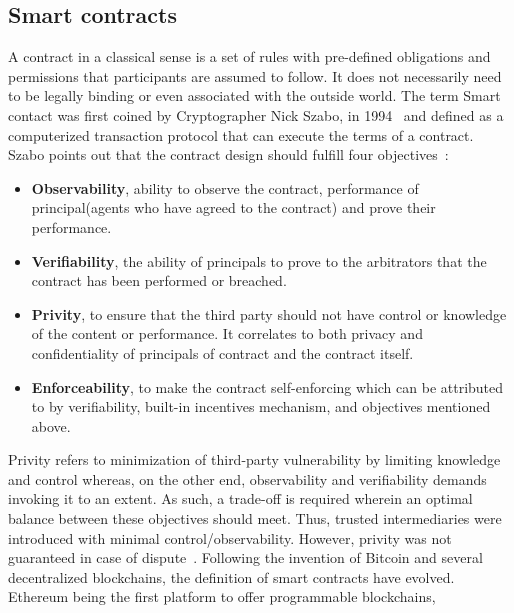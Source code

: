 \subsection{Smart contracts}
A contract in a classical sense is a set of rules with pre-defined obligations
and permissions that participants are assumed to follow. It does not
necessarily need to be legally binding or even associated with the outside
world. The term Smart contact was first coined by Cryptographer Nick Szabo, in
1994~\cite{SzaboSmart1994} and defined as a computerized transaction protocol
that can execute the terms of a contract. Szabo points out that the contract
design should fulfill four objectives~\cite{szabo1996smart}: \\
\begin{itemize}
	\item \textbf{Observability}, ability to observe the contract, performance of
		principal(agents who have agreed to the contract) and prove their
		performance.\\
	\item \textbf{Verifiability}, the ability of principals to prove to the
		arbitrators that the contract has been performed or breached. \\ 
	\item \textbf{Privity}, to ensure that the third party should not have
		control or knowledge of the content or performance. It correlates to
		both privacy and confidentiality of principals of contract and the
		contract itself. \\
	\item \textbf{Enforceability}, to make the contract self-enforcing which
		can be attributed to by verifiability, built-in incentives mechanism,
		and objectives mentioned above. \\
\end{itemize}
Privity refers to minimization of third-party vulnerability by limiting
knowledge and control whereas, on the other end, observability and
verifiability demands invoking it to an extent. As such, a trade-off is
required wherein an optimal balance between these objectives should meet. Thus,
trusted intermediaries were introduced with minimal control/observability.
However, privity was not guaranteed in case of
dispute~\cite{szabo1997formalizing}. Following the invention of Bitcoin and
several decentralized blockchains, the definition of smart contracts have
evolved. Ethereum being the first platform to offer programmable blockchains,
